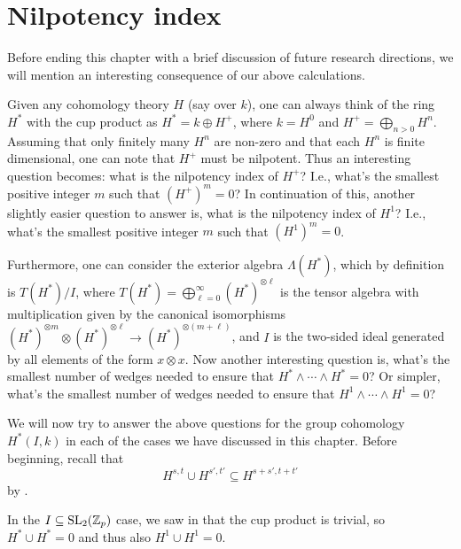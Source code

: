 \section{Nilpotency index}%
\label{sec:nilp-index}

Before ending this chapter with a brief discussion of future research directions, we will mention an interesting consequence of our above calculations.

Given any cohomology theory $H$ (say over $k$), one can always think of the ring $H^{*}$ with the cup product as $H^{*} = k \oplus H^{+}$, where $k = H^{0}$ and $H^{+} = \bigoplus_{n>0} H^{n}$. Assuming that only finitely many $H^{n}$ are non-zero and that each $H^{n}$ is finite dimensional, one can note that $H^{+}$ must be nilpotent. Thus an interesting question becomes: what is the nilpotency index of $H^{+}$? I.e., what's the smallest positive integer $m$ such that $(H^{+})^{m} = 0$? In continuation of this, another slightly easier question to answer is, what is the nilpotency index of $H^{1}$? I.e., what's the smallest positive integer $m$ such that $(H^{1})^{m} = 0$.

Furthermore, one can consider the exterior algebra $\Lambda(H^{*})$, which by definition is $T(H^{*})/I$, where $T(H^{*}) = \bigoplus_{\ell=0}^{\infty} (H^{*})^{\otimes \ell}$ is the tensor algebra with multiplication given by the canonical isomorphisms $(H^{*})^{\otimes m} \otimes (H^{*})^{\otimes \ell} \to (H^{*})^{\otimes(m+\ell)}$, and $I$ is the two-sided ideal generated by all elements of the form $x \otimes x$. Now another interesting question is, what's the smallest number of wedges needed to ensure that $H^{*} \wedge \dotsb \wedge H^{*} = 0$? Or simpler, what's the smallest number of wedges needed to ensure that $H^{1} \wedge \dotsb \wedge H^{1} = 0$? 

We will now try to answer the above questions for the group cohomology $H^{*}(I,k)$ in each of the cases we have discussed in this chapter. Before beginning, recall that
\begin{equation}\label{eq:graded-coh-inc}
  H^{s,t} \cup H^{s',t'} \subseteq H^{s+s',t+t'}
\end{equation}
by \cite[§3.7]{Fuks}.

In the $I \subseteq \operatorname{SL}_{2}(\mathbb{Z}_{p})$ case, we saw in  that the cup product is trivial, so $H^{*} \cup H^{*} = 0$ and thus also $H^{1} \cup H^{1} = 0$.

